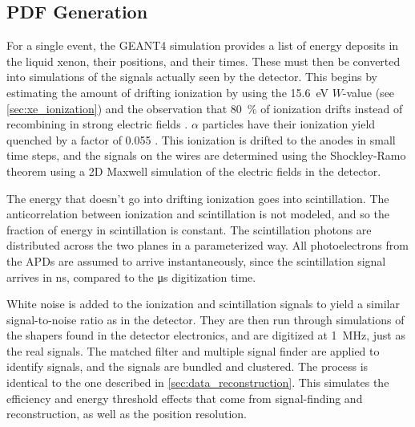 \documentclass[herrin-thesis.tex]{subfiles}
\begin{document}


\subsection{PDF Generation}
For a single event, the GEANT4 simulation provides a list of energy deposits in the liquid xenon, their positions, and their times. These must then be converted into simulations of the signals actually seen by the detector. This begins by estimating the amount of drifting ionization by using the \SI{15.6}{\eV} \(W\)-value (see \cref{sec:xe_ionization}) and the observation that \about{}\SI{80}{\percent} of ionization drifts instead of recombining in strong electric fields \cite{Aprile:1991fk}. \(\alpha\) particles have their ionization yield quenched by a factor of 0.055 \cite{Aprile:1991uq}. This ionization is drifted to the anodes in small time steps, and the signals on the wires are determined using the Shockley-Ramo theorem using a 2D Maxwell \cite{Maxwell} simulation of the electric fields in the detector.

The energy that doesn't go into drifting ionization goes into scintillation. The anticorrelation between ionization and scintillation is not modeled, and so the fraction of energy in scintillation is constant. The scintillation photons are distributed across the two planes in a parameterized way. All photoelectrons from the APDs are assumed to arrive instantaneously, since the scintillation signal arrives in \si{\ns}, compared to the \si{\micro\s} digitization time.

White noise is added to the ionization and scintillation signals to yield a similar signal-to-noise ratio as in the detector. They are then run through simulations of the shapers found in the detector electronics, and are digitized at \SI{1}{\MHz}, just as the real signals. The matched filter and multiple signal finder are applied to identify signals, and the signals are bundled and clustered. The process is identical to the one described in \cref{sec:data_reconstruction}. This simulates the efficiency and energy threshold effects that come from signal-finding and reconstruction, as well as the position resolution.
\end{document}
